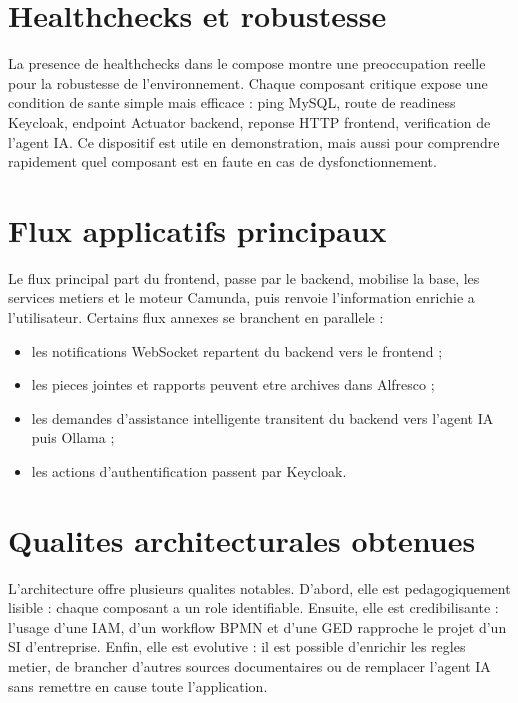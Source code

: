 \documentclass[12pt,a4paper,oneside]{report}
\begin{document}
\section{Healthchecks et robustesse}

La presence de healthchecks dans le compose montre une preoccupation reelle pour la robustesse de l'environnement. Chaque composant critique expose une condition de sante simple mais efficace : ping MySQL, route de readiness Keycloak, endpoint Actuator backend, reponse HTTP frontend, verification de l'agent IA. Ce dispositif est utile en demonstration, mais aussi pour comprendre rapidement quel composant est en faute en cas de dysfonctionnement.

\section{Flux applicatifs principaux}

Le flux principal part du frontend, passe par le backend, mobilise la base, les services metiers et le moteur Camunda, puis renvoie l'information enrichie a l'utilisateur. Certains flux annexes se branchent en parallele :

\begin{itemize}[leftmargin=1.2cm]
  \item les notifications WebSocket repartent du backend vers le frontend ;
  \item les pieces jointes et rapports peuvent etre archives dans Alfresco ;
  \item les demandes d'assistance intelligente transitent du backend vers l'agent IA puis Ollama ;
  \item les actions d'authentification passent par Keycloak.
\end{itemize}

\section{Qualites architecturales obtenues}

L'architecture offre plusieurs qualites notables. D'abord, elle est pedagogiquement lisible : chaque composant a un role identifiable. Ensuite, elle est credibilisante : l'usage d'une IAM, d'un workflow BPMN et d'une GED rapproche le projet d'un SI d'entreprise. Enfin, elle est evolutive : il est possible d'enrichir les regles metier, de brancher d'autres sources documentaires ou de remplacer l'agent IA sans remettre en cause toute l'application.
\end{document}
